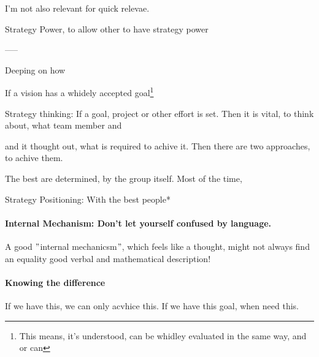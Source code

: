I'm not also relevant for quick relevae.

Strategy Power, to allow other to have strategy power


-----

Deeping on how 

If a vision has a whidely accepted goal\footnote{
	This means, it's understood, can be whidley evaluated in the same way, and or can 
}

Strategy thinking: If a goal, project or other effort is set. Then it is vital, to think about, what team member and 

and it thought out, what is required to achive it. Then there are two approaches, to achive them.

The best are determined, by the group itself.
Most of the time, 

Strategy Positioning: With the best people*


\paragraph{Internal Mechanism: Don't let yourself confused by language.}

A good $"$internal mechanicsm$"$, which feels like a thought, might not always find an equality good verbal and mathematical description!


\paragraph{Knowing the difference}
If we have this, we can only acvhice this.
If we have this goal, when need this.

